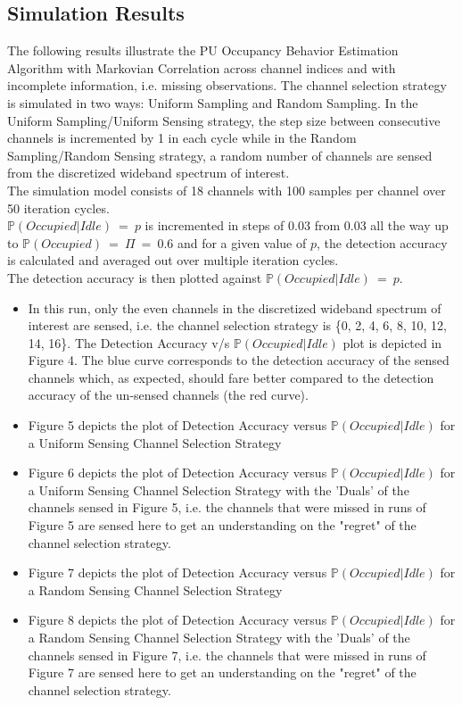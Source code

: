 \documentclass[12pt, draftcls, onecolumn]{IEEEtran}
\begin{document}
\subsection{Simulation Results}
The following results illustrate the PU Occupancy Behavior Estimation Algorithm with Markovian Correlation across channel indices and with incomplete information, i.e. missing observations. The channel selection strategy is simulated in two ways: Uniform Sampling and Random Sampling. In the Uniform Sampling/Uniform Sensing strategy, the step size between consecutive channels is incremented by 1 in each cycle while in the Random Sampling/Random Sensing strategy, a random number of channels are sensed from the discretized wideband spectrum of interest.
\\The simulation model consists of 18 channels with 100 samples per channel over 50 iteration cycles.
\\$\mathbb P(Occupied|Idle)\ =\ p$ is incremented in steps of $0.03$ from $0.03$ all the way up to $\mathbb P(Occupied)\ =\ \Pi\ =\ 0.6$ and for a given value of $p$, the detection accuracy is calculated and averaged out over multiple iteration cycles.
\\The detection accuracy is then plotted against $\mathbb P(Occupied|Idle)\ =\ p$.
\begin{itemize}
    \item In this run, only the even channels in the discretized wideband spectrum of interest are sensed, i.e. the channel selection strategy is \{0, 2, 4, 6, 8, 10, 12, 14, 16\}. The Detection Accuracy v/s $\mathbb P(Occupied|Idle)$ plot is depicted in Figure 4. The blue curve corresponds to the detection accuracy of the sensed channels which, as expected, should fare better compared to the detection accuracy of the un-sensed channels (the red curve).
    \item Figure 5 depicts the plot of Detection Accuracy versus $\mathbb P(Occupied|Idle)$ for a Uniform Sensing Channel Selection Strategy
    \item Figure 6 depicts the plot of Detection Accuracy versus $\mathbb P(Occupied|Idle)$ for a Uniform Sensing Channel Selection Strategy with the 'Duals' of the channels sensed in Figure 5, i.e. the channels that were missed in runs of Figure 5 are sensed here to get an understanding on the "regret" of the channel selection strategy.
    \item Figure 7 depicts the plot of Detection Accuracy versus $\mathbb P(Occupied|Idle)$ for a Random Sensing Channel Selection Strategy
    \item Figure 8 depicts the plot of Detection Accuracy versus $\mathbb P(Occupied|Idle)$ for a Random Sensing Channel Selection Strategy with the 'Duals' of the channels sensed in Figure 7, i.e. the channels that were missed in runs of Figure 7 are sensed here to get an understanding on the "regret" of the channel selection strategy.
\end{itemize}
\end{document}
